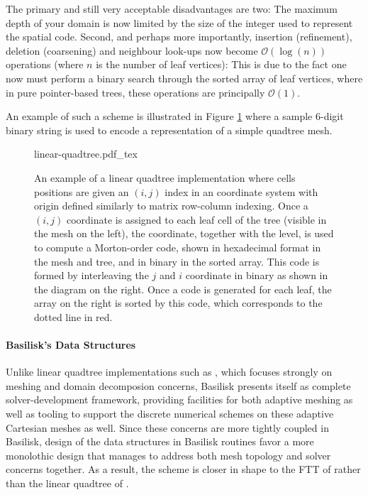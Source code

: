 The primary and still very acceptable disadvantages are two: The maximum depth
of your domain is now limited by the size of the integer used to represent the
spatial code. Second, and perhaps more importantly, insertion (refinement),
deletion (coarsening) and neighbour look-ups now become
\(\mathcal{O}(\log{(n)})\) operations (where \(n\) is the number of leaf
vertices): This is due to the fact one now must perform a binary search through
the sorted array of leaf vertices, where in pure pointer-based trees, these
operations are principally \(\mathcal{O}(1)\).

An example of such a scheme is illustrated in Figure \ref{fig:linear-quadtree}
where a sample 6-digit binary string is used to encode a representation of a
simple quadtree mesh.

\begin{figure}[H]
    \centering
    \def\svgwidth{\textwidth}
    {linear-quadtree.pdf_tex}
    \caption{An example of a linear quadtree implementation where cells positions are given an \((i,j)\) index in an coordinate system with origin defined similarly to matrix row-column indexing. Once a \((i,j)\) coordinate is assigned to each leaf cell of the tree (visible in the mesh on the left), the coordinate, together with the level, is used to compute a Morton-order code, shown in hexadecimal format in the mesh and tree, and in binary in the sorted array. This code is formed by interleaving the \(j\) and \(i\) coordinate in binary as shown in the diagram on the right. Once a code is generated for each leaf, the array on the right is sorted by this code, which corresponds to the dotted line in red.}
    \label{fig:linear-quadtree}
\end{figure}

\paragraph{Basilisk's Data Structures}

Unlike linear quadtree implementations such as \textcite{burstedde_p4est_2011},
which focuses strongly on meshing and domain decomposion concerns, Basilisk
presents itself as complete solver-development framework, providing facilities
for both adaptive meshing as well as tooling to support the discrete numerical
schemes on these adaptive Cartesian meshes as well. Since these concerns are
more tightly coupled in Basilisk, design of the data structures in Basilisk
routines favor a more monolothic design that manages to address both mesh
topology and solver concerns together. As a result, the scheme is closer in
shape to the FTT of \textcite{khokhlov_fully_1998} rather than the linear
quadtree of \textcite{burstedde_p4est_2011}.

